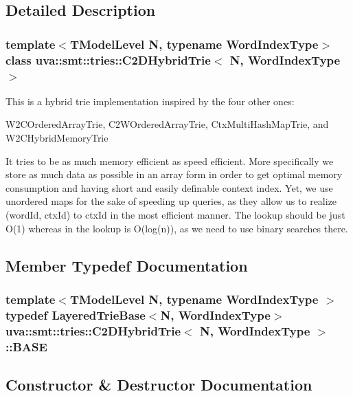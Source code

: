 \subsection{Detailed Description}
\subsubsection*{template$<$T\+Model\+Level N, typename Word\+Index\+Type$>$class uva\+::smt\+::tries\+::\+C2\+D\+Hybrid\+Trie$<$ N, Word\+Index\+Type $>$}

This is a hybrid trie implementation inspired by the four other ones\+:

W2\+C\+Ordered\+Array\+Trie, C2\+W\+Ordered\+Array\+Trie, Ctx\+Multi\+Hash\+Map\+Trie, and W2\+C\+Hybrid\+Memory\+Trie

It tries to be as much memory efficient as speed efficient. More specifically we store as much data as possible in an array form in order to get optimal memory consumption and having short and easily definable context index. Yet, we use unordered maps for the sake of speeding up queries, as they allow us to realize (word\+Id, ctx\+Id) to ctx\+Id in the most efficient manner. The lookup should be just O(1) whereas in the lookup is O(log(n)), as we need to use binary searches there. 

\subsection{Member Typedef Documentation}
\hypertarget{classuva_1_1smt_1_1tries_1_1_c2_d_hybrid_trie_a33ce4730ea0896a4ea7995c9e80688f7}{}
\subsubsection[{B\+A\+S\+E}]{\setlength{\rightskip}{0pt plus 5cm}template$<$T\+Model\+Level N, typename Word\+Index\+Type $>$ typedef {\bf Layered\+Trie\+Base}$<$N, {\bf Word\+Index\+Type}$>$ {\bf uva\+::smt\+::tries\+::\+C2\+D\+Hybrid\+Trie}$<$ N, {\bf Word\+Index\+Type} $>$\+::{\bf B\+A\+S\+E}}\label{classuva_1_1smt_1_1tries_1_1_c2_d_hybrid_trie_a33ce4730ea0896a4ea7995c9e80688f7}


\subsection{Constructor \& Destructor Documentation}
\hypertarget{classuva_1_1smt_1_1tries_1_1_c2_d_hybrid_trie_a390e38bc6e12db2878af63bacabf2e05}{}
